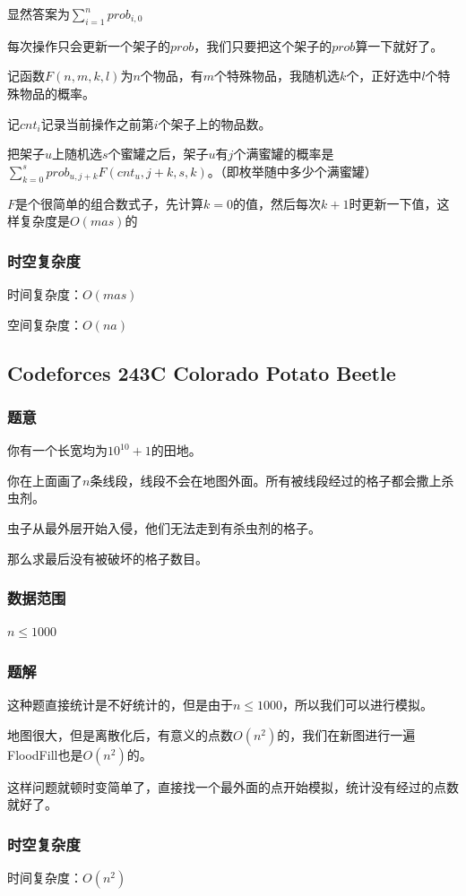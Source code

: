 \documentclass{ctexart}
\begin{document}
显然答案为$\sum\limits_{i=1}^n prob_{i,0}$

每次操作只会更新一个架子的$prob$，我们只要把这个架子的$prob$算一下就好了。

记函数$F(n,m,k,l)$为$n$个物品，有$m$个特殊物品，我随机选$k$个，正好选中$l$个特殊物品的概率。

记$cnt_i$记录当前操作之前第$i$个架子上的物品数。

把架子$u$上随机选$s$个蜜罐之后，架子$u$有$j$个满蜜罐的概率是$\sum\limits_{k=0}^s prob_{u,j+k}F(cnt_u,j+k,s,k)$。（即枚举随中多少个满蜜罐）

$F$是个很简单的组合数式子，先计算$k=0$的值，然后每次$k+1$时更新一下值，这样复杂度是$O(mas)$的
\subsubsection{时空复杂度}
时间复杂度：$O(mas)$

空间复杂度：$O(na)$
\begin{displaymath}
\end{displaymath}
\subsection{Codeforces 243C Colorado Potato Beetle}
\subsubsection{题意}
你有一个长宽均为$10^{10}+1$的田地。

你在上面画了$n$条线段，线段不会在地图外面。所有被线段经过的格子都会撒上杀虫剂。

虫子从最外层开始入侵，他们无法走到有杀虫剂的格子。

那么求最后没有被破坏的格子数目。
\subsubsection{数据范围}
$n \le 1000$
\subsubsection{题解}
这种题直接统计是不好统计的，但是由于$n \le 1000$，所以我们可以进行模拟。

地图很大，但是离散化后，有意义的点数$O(n^2)$的，我们在新图进行一遍FloodFill也是$O(n^2)$的。

这样问题就顿时变简单了，直接找一个最外面的点开始模拟，统计没有经过的点数就好了。
\subsubsection{时空复杂度}
时间复杂度：$O(n^2)$
\end{document}

